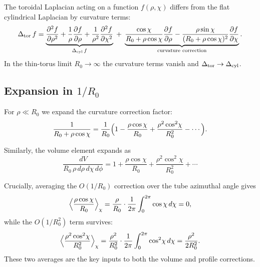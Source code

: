 \documentclass[11pt,a4paper]{article}
\theoremstyle{definition}
\theoremstyle{remark}
\newcommand{\Rzero}{R_0}
\begin{document}
The toroidal Laplacian acting on a function $f(\rho,\chi)$ differs from the
flat cylindrical Laplacian by curvature terms:
\begin{equation}
  \Delta_{\rm tor}\,f
  = \underbrace{\frac{\partial^2 f}{\partial\rho^2}
    + \frac{1}{\rho}\frac{\partial f}{\partial\rho}
    + \frac{1}{\rho^2}\frac{\partial^2 f}{\partial\chi^2}}_{\Delta_{\rm cyl}\,f}
  \;+\;
  \underbrace{\frac{\cos\chi}{\Rzero+\rho\cos\chi}\frac{\partial f}{\partial\rho}
  - \frac{\rho\sin\chi}{(\Rzero+\rho\cos\chi)^2}\frac{\partial f}{\partial\chi}}_{\text{curvature correction}}.
  \label{P14:eq:laplacian_split}
\end{equation}
In the thin-torus limit $\Rzero\to\infty$ the curvature terms vanish
and $\Delta_{\rm tor}\to\Delta_{\rm cyl}$.

\subsection{Expansion in $1/\Rzero$}

For $\rho\ll\Rzero$ we expand the curvature correction factor:
\begin{equation}
  \frac{1}{\Rzero+\rho\cos\chi}
  = \frac{1}{\Rzero}\Bigl(1 - \frac{\rho\cos\chi}{\Rzero}
  + \frac{\rho^2\cos^2\!\chi}{\Rzero^2} - \cdots\Bigr).
  \label{P14:eq:expansion}
\end{equation}

Similarly, the volume element expands as
\begin{equation}
  \frac{dV}{\Rzero\,\rho\,d\rho\,d\chi\,d\phi}
  = 1 + \frac{\rho\cos\chi}{\Rzero}
  + \frac{\rho^2\cos^2\!\chi}{\Rzero^2} + \cdots
  \label{P14:eq:volume_expand}
\end{equation}

Crucially, averaging the $O(1/\Rzero)$ correction over the tube
azimuthal angle gives
\begin{equation}
  \Bigl\langle\frac{\rho\cos\chi}{\Rzero}\Bigr\rangle_\chi
  = \frac{\rho}{\Rzero}\cdot\frac{1}{2\pi}\int_0^{2\pi}\cos\chi\,d\chi
  = 0,
  \label{P14:eq:cos_avg}
\end{equation}
while the $O(1/\Rzero^2)$ term survives:
\begin{equation}
  \Bigl\langle\frac{\rho^2\cos^2\!\chi}{\Rzero^2}\Bigr\rangle_\chi
  = \frac{\rho^2}{\Rzero^2}\cdot\frac{1}{2\pi}\int_0^{2\pi}\cos^2\!\chi\,d\chi
  = \frac{\rho^2}{2\Rzero^2}.
  \label{P14:eq:cos2_avg}
\end{equation}
These two averages are the key inputs to both the volume and profile corrections.
\end{document}
